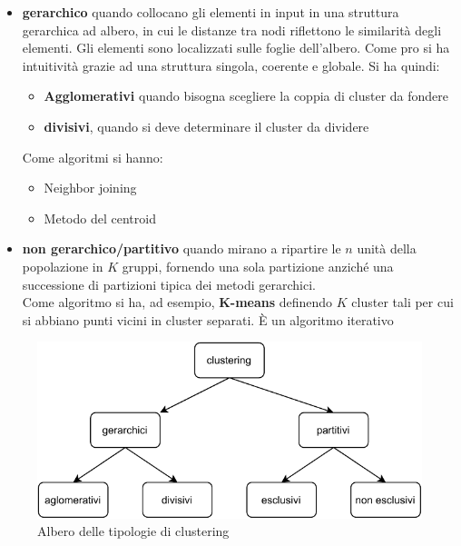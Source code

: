\documentclass[a4paper,12pt, oneside]{book}
\begin{document}
\begin{itemize}
  \item \textbf{gerarchico} quando collocano gli elementi in input in una
  struttura gerarchica ad albero, in cui le distanze tra nodi riflettono le
  similarità degli elementi. Gli elementi sono localizzati sulle foglie
  dell’albero. Come pro si ha intuitività grazie ad una struttura singola,
  coerente e globale. Si ha quindi:
  \begin{itemize}
    \item \textbf{Agglomerativi} quando bisogna scegliere la coppia di cluster da fondere
    \item \textbf{divisivi}, quando si deve determinare il cluster da dividere
  \end{itemize}
  Come algoritmi si hanno:
  \begin{itemize}
    \item Neighbor joining
    \item Metodo del centroid
  \end{itemize}
  \item \textbf{non gerarchico/partitivo} quando mirano a ripartire le $n$ unità
  della popolazione in $K$ gruppi, fornendo una sola partizione anziché una
  successione di partizioni tipica dei metodi gerarchici.\\
  Come algoritmo si ha, ad esempio, \textbf{K-means}
  definendo $K$ cluster tali per cui si abbiano punti vicini in cluster
  separati. È un algoritmo iterativo
\end{itemize}
\begin{figure}
  \centering
  \includegraphics[scale = 1]{img/clu.pdf}
  \caption{Albero delle tipologie di clustering}
  \label{fig:clu}
\end{figure}
\end{document}
